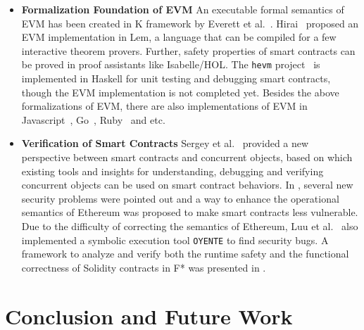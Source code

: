 \documentclass[runningheads]{llncs}
\begin{document}
\begin{itemize}
    \item \textbf{Formalization Foundation of EVM} An executable formal semantics of EVM has been created in K framework by Everett et al.~\cite{hildenbrandt2017kevm}. Hirai~\cite{hirai2017defining} proposed an EVM implementation in Lem, a language that can be compiled for a few interactive theorem provers. Further, safety properties of smart contracts can be proved in proof assistants like Isabelle/HOL. The \texttt{hevm} project~\cite{hevm} is implemented in Haskell for unit testing and debugging smart contracts, though the EVM implementation is not completed yet. Besides the above formalizations of EVM, there are also implementations of EVM in Javascript~\cite{vmjs}, Go~\cite{vmgo}, Ruby~\cite{cryptape} and etc.
    \item \textbf{Verification of Smart Contracts} Sergey et al.~\cite{sergey2017concurrent} provided a new perspective between smart contracts and concurrent objects, based on which existing tools and insights for understanding, debugging and verifying concurrent objects can be used on smart contract behaviors. In \cite{luu2016making}, several new security problems were pointed out and a way to enhance the operational semantics of Ethereum was proposed to make smart contracts less vulnerable. Due to the difficulty of correcting the semantics of Ethereum, Luu et al.~\cite{luu2016making} also implemented a symbolic execution tool \texttt{OYENTE} to find security bugs. A framework to analyze and verify both the runtime safety and the functional correctness of Solidity contracts in F* was presented in \cite{bhargavan2016formal}.
\end{itemize} 

\section{Conclusion and Future Work}\label{Sec: Conclusion}






\end{document}
